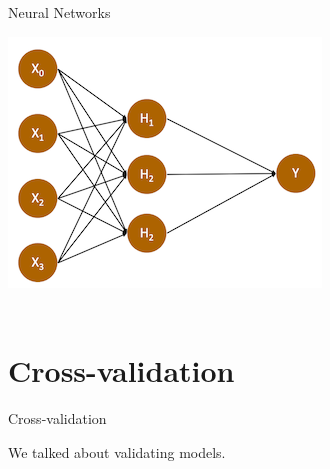 \documentclass[handout]{beamer}
\begin{document}
\begin{frame}{Neural Networks}
	
	\begin{center}
		\includegraphics{../pictures/neuralnetwork_hiddenlayer.png} \\\
	\end{center}
	
	\begin{tiny}
	\end{tiny}
	
	
	
	
	
\end{frame}




\section{Cross-validation}

\begin{frame}{Cross-validation}

We talked about validating models.

\end{frame}
\end{document}
